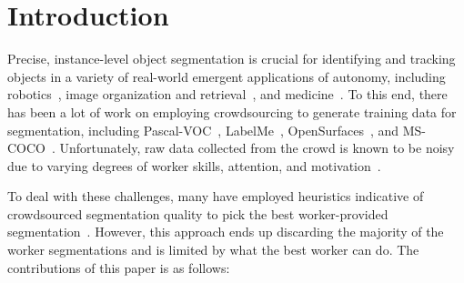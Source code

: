 \section{Introduction\label{sec:intro}}

Precise, instance-level object segmentation is crucial for identifying and tracking objects in a variety of real-world emergent applications of autonomy, including robotics~\cite{Natonek1998}, image organization and retrieval~\cite{Yamaguchi2012}, and medicine~\cite{Irshad2014}. To this end, there has been a lot of work on employing crowdsourcing to generate training data for segmentation, including Pascal-VOC~\cite{Everingham15}, LabelMe~\cite{Torralba2010}, OpenSurfaces~\cite{bell15minc}, and MS-COCO~\cite{Lin2012}. Unfortunately, raw data collected from the crowd is known to be noisy due to varying degrees of worker skills, attention, and motivation~\cite{bell14intrinsic,MDWWelinder2010}. 
\par To deal with these challenges, many have employed heuristics indicative of crowdsourced segmentation quality to pick the best worker-provided segmentation~\cite{Sorokin2008,Vittayakorn2011}. However, this approach ends up discarding the majority of the worker segmentations and is limited by what the best worker can do. The contributions of this paper is as follows: 
